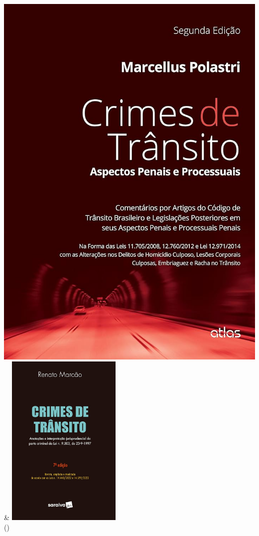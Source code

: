 \documentclass[
  letterpaper,
  DIV=11,
  numbers=noendperiod]{scrreport}
\begin{document}
\begin{longtable}[]
\includegraphics{./images/crime3-01.jpg} &
\includegraphics[width=2.16667in,height=\textheight]{./images/crime2-01.jpg} \\
\bottomrule()
\end{longtable}
\end{document}
